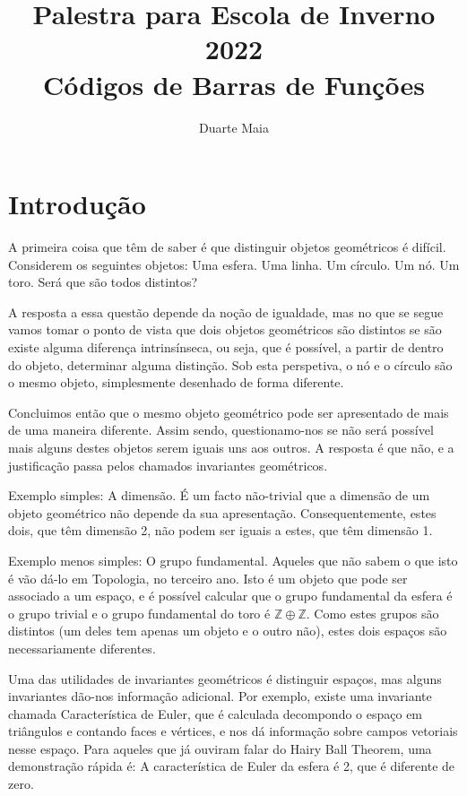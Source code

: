\documentclass[12pt]{article}
\title{Palestra para Escola de Inverno 2022\\
Códigos de Barras de Funções}
\author{Duarte Maia}
\theoremstyle{nonumberplain}
\newcommand{\Z}{\mathbb{Z}}
\begin{document}
\maketitle

\section{Introdução}

A primeira coisa que têm de saber é que distinguir objetos geométricos é difícil. Considerem os seguintes objetos: Uma esfera. Uma linha. Um círculo. Um nó. Um toro. Será que são todos distintos?

A resposta a essa questão depende da noção de igualdade, mas no que se segue vamos tomar o ponto de vista que dois objetos geométricos são distintos se são existe alguma diferença intrinsínseca, ou seja, que é possível, a partir de dentro do objeto, determinar alguma distinção. Sob esta perspetiva, o nó e o círculo são o mesmo objeto, simplesmente desenhado de forma diferente.

Concluimos então que o mesmo objeto geométrico pode ser apresentado de mais de uma maneira diferente. Assim sendo, questionamo-nos se não será possível mais alguns destes objetos serem iguais uns aos outros. A resposta é que não, e a justificação passa pelos chamados invariantes geométricos.

Exemplo simples: A dimensão. É um facto não-trivial que a dimensão de um objeto geométrico não depende da sua apresentação. Consequentemente, estes dois, que têm dimensão 2, não podem ser iguais a estes, que têm dimensão 1.

Exemplo menos simples: O grupo fundamental. Aqueles que não sabem o que isto é vão dá-lo em Topologia, no terceiro ano. Isto é um objeto que pode ser associado a um espaço, e é possível calcular que o grupo fundamental da esfera é o grupo trivial e o grupo fundamental do toro é $\Z \oplus \Z$. Como estes grupos são distintos (um deles tem apenas um objeto e o outro não), estes dois espaços são necessariamente diferentes.

Uma das utilidades de invariantes geométricos é distinguir espaços, mas alguns invariantes dão-nos informação adicional. Por exemplo, existe uma invariante chamada Característica de Euler, que é calculada decompondo o espaço em triângulos e contando faces e vértices, e nos dá informação sobre campos vetoriais nesse espaço. Para aqueles que já ouviram falar do Hairy Ball Theorem, uma demonstração rápida é: A característica de Euler da esfera é 2, que é diferente de zero.
\end{document}
